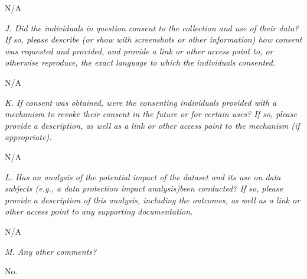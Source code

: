 \documentclass{article}
\begin{document}
N/A

\textit{J. Did the individuals in question consent to the collection and use of their data? If so, please describe (or show with screenshots or other information) how consent was requested and provided, and provide a link or other access point to, or otherwise reproduce, the exact language to which the individuals consented.}

N/A

\textit{K. If consent was obtained, were the consenting individuals provided with a mechanism to revoke their consent in the future or for certain uses? If so, please provide a description, as well as a link or other access point to the mechanism (if appropriate).}

N/A

\textit{L. Has an analysis of the potential impact of the dataset and its use on data subjects (e.g., a data protection impact analysis)been conducted? If so, please provide a description of this analysis, including the outcomes, as well as a link or other access point to any supporting documentation.}

N/A

\textit{M. Any other comments?}

No.
\end{document}
